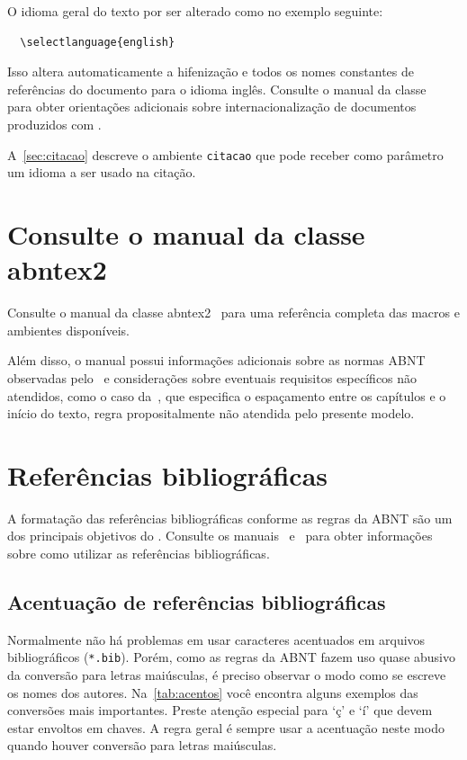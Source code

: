 O idioma geral do texto por ser alterado como no exemplo seguinte:

\begin{verbatim}
  \selectlanguage{english}
\end{verbatim}

Isso altera automaticamente a hifenização e todos os nomes constantes de
referências do documento para o idioma inglês. Consulte o manual da classe~\cite{abntex2classe} para obter orientações adicionais sobre internacionalização de
documentos produzidos com \abnTeX.

A~\cref{sec:citacao} descreve o ambiente \texttt{citacao} que pode receber
como parâmetro um idioma a ser usado na citação.

\section{Consulte o manual da classe \textsf{abntex2}}

Consulte o manual da classe \textsf{abntex2}~\cite{abntex2classe} para uma
referência completa das macros e ambientes disponíveis.

Além disso, o manual possui informações adicionais sobre as normas ABNT
observadas pelo \abnTeX\ e considerações sobre eventuais requisitos específicos
não atendidos, como o caso da~, que
especifica o espaçamento entre os capítulos e o início do texto, regra
propositalmente não atendida pelo presente modelo.

\section{Referências bibliográficas}

A formatação das referências bibliográficas conforme as regras da ABNT são um
dos principais objetivos do \abnTeX. Consulte os manuais~ e~ para obter informações
sobre como utilizar as referências bibliográficas.

\subsection{Acentuação de referências bibliográficas}

Normalmente não há problemas em usar caracteres acentuados em arquivos
bibliográficos (\texttt{*.bib}). Porém, como as regras da ABNT fazem uso quase
abusivo da conversão para letras maiúsculas, é preciso observar o modo como se
escreve os nomes dos autores. Na~\cref{tab:acentos} você encontra alguns
exemplos das conversões mais importantes. Preste atenção especial para `ç' e `í'
que devem estar envoltos em chaves. A regra geral é sempre usar a acentuação
neste modo quando houver conversão para letras maiúsculas.


